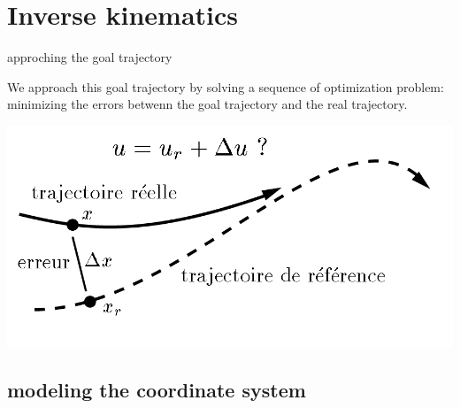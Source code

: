 \documentclass{beamer}
\begin{document}
\section{Inverse kinematics}


\begin{frame}{approching the goal trajectory}

We approach this goal trajectory by solving a sequence of optimization problem: minimizing the errors betwenn the goal trajectory and the real trajectory.
\medskip

\includegraphics[scale = 0.4]{tracking.jpg}\cite{2}
\end{frame}

\subsection{modeling the coordinate system}
\end{document}
